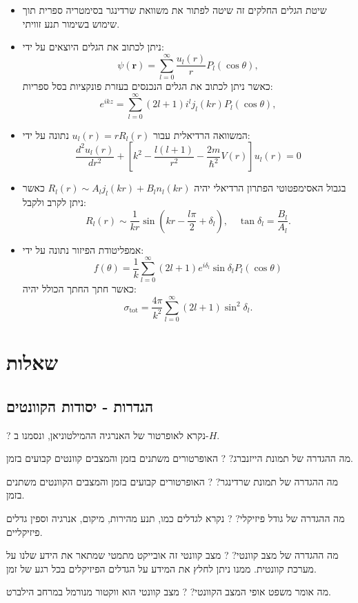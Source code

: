\documentclass{tstextbook}
\begin{document}
\begin{summary}
  \begin{itemize}
    \item שיטת הגלים החלקים זה שיטה לפתור את משוואת שרדינגר בסימטריה ספרית תוך שימוש בשימור תנע זוויתי.
    \item ניתן לכתוב את הגלים היוצאים על ידי:
$$\psi(\mathbf{r})=\sum_{l=0}^{\infty}{\frac{u_{l}(r)}{r}}P_{l}(\cos\theta),$$
כאשר ניתן לכתוב את הגלים הנכנסים בעזרת פונקציות בסל ספריות:
$$e^{i k z}=\sum_{l=0}^{\infty}(2l+1)i^{l}j_{l}(k r)P_{l}(\cos\theta),$$
    \item המשוואה הרדיאלית עבור \(u_{l}(r)=rR_{l}(r)\) נתונה על ידי:
$$\frac{d^{2}u_{l}(r)}{d r^{2}}+\left[k^{2}-\frac{l(l+1)}{r^{2}}-\frac{2m}{\hbar^{2}}V(r)\right]u_{l}(r)=0$$
    \item בגבול האסימפטוטי הפתרון הרדיאלי יהיה \(R_{l}(r)\sim A_{l}j_{l}(k r)+B_{l}n_{l}(k r)\) כאשר ניתן לקרב ולקבל:
$$R_{l}(r)\sim\frac{1}{k r}\sin\left(k r-\frac{l\pi}{2}+\delta_{l}\right),\quad\tan\delta_{l}=\frac{B_{l}}{A_{l}}.$$
    \item אמפליטודת הפיזור נתונה על ידי:
$$f(\theta)=\frac{1}{k}\sum_{l=0}^{\infty}(2l+1)e^{i\delta_{l}}\sin\delta_{l}P_{l}(\cos\theta)$$
כאשר חתך החתך הכולל יהיה:
$$\sigma_{\mathrm{tot}}=\frac{4\pi}{k^{2}}\sum_{l=0}^{\infty}(2l+1)\sin^{2}\delta_{l}.$$
  \end{itemize}
\end{summary}
\chapter{שאלות}

\section{הגדרות - יסודות הקוונטים}

?
נקרא לאופרטור של האנרגיה ההמילטוניאן, ונסמנו ב-\(H\).

מה ההגדרה של תמונת הייזנברג?
?
האופרטורים משתנים בזמן והמצבים קוונטים קבועים בזמן.

מה ההגדרה של תמונת שרדינגר?
?
האופרטורים קבועים בזמן והמצבים הקוונטים משתנים בזמן.

מה ההגדרה של גודל פיזיקלי?
?
נקרא לגדלים כמו, תנע מהירות, מיקום, אנרגיה וספין גדלים פיזיקליים.

מה ההגדרה של מצב קוונטי?
?
מצב קוונטי זה אובייקט מתמטי שמתאר את הידע שלנו על מערכת קוונטית. ממנו ניתן לחלץ את המידע על הגדלים הפיזיקלים בכל רגע של זמן.

מה אומר משפט אופי המצב הקוונטי?
?
מצב קוונטי הוא ווקטור מנורמל במרחב הילברט.
\end{document}
